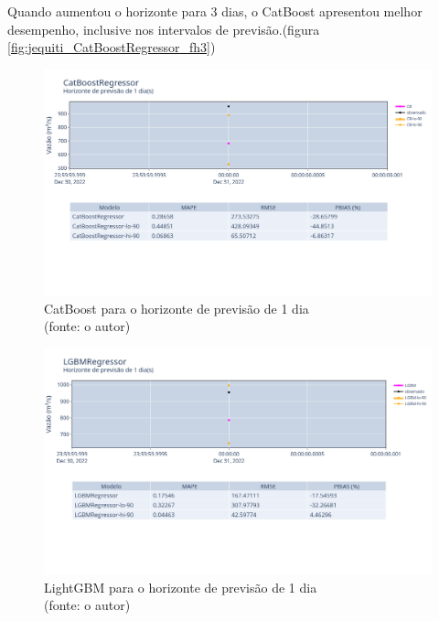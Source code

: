 Quando aumentou o horizonte para 3 dias, o CatBoost apresentou melhor desempenho, inclusive nos intervalos de previsão.(figura \ref{fig:jequiti_CatBoostRegressor_fh3})

\begin{figure}[!h]
	\centering
	\includegraphics[scale=0.33]{Figuras/jequiti/resultados/CatBoostRegressor_fh1.png}
	\caption{CatBoost para o horizonte de previsão de 1 dia\\(fonte: o autor)}
	\label{fig:jequiti_CatBoostRegressor_fh1}
\end{figure}

\begin{figure}[!h]
	\centering
	\includegraphics[scale=0.33]{Figuras/jequiti/resultados/LGBMRegressor_fh1.png}
	\caption{LightGBM para o horizonte de previsão de 1 dia\\(fonte: o autor)}
	\label{fig:jequiti_LGBMRegressor_fh1}
\end{figure}

